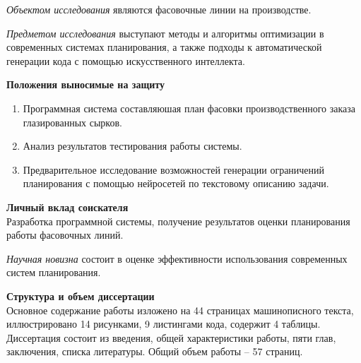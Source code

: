 \vspace{6mm}


\textit{Объектом исследования} являются фасовочные линии на производстве.

\vspace{6mm}

\textit{Предметом исследования} выступают методы и алгоритмы оптимизации в современных системах планирования, а также подходы к автоматической генерации кода с помощью искусственного интеллекта.

\vspace{6mm}

\noindent \textbf{Положения выносимые на защиту}
\begin{enumerate}
    \item Программная система составляюшая план фасовки производственного заказа глазированных сырков.
    \item Анализ результатов тестирования работы системы.
    \item Предварительное исследование возможностей генерации ограничений планирования с помощью нейросетей по текстовому описанию задачи.
\end{enumerate}

\vspace{6mm}

\noindent \textbf{Личный вклад соискателя}\\
\indent Разработка программной системы, получение результатов оценки планирования работы фасовочных линий.

\vspace{6mm}

\textit{Научная новизна} состоит в оценке эффективности использования современных систем планирования.

\vspace{6mm}

\noindent \textbf{Структура и объем диссертации}\\

Основное содержание работы изложено на 44 страницах машинописного текста, иллюстрировано 14 рисунками, 9 листингами кода, содержит 4 таблицы. Диссертация состоит из введения, общей характеристики работы, пяти глав, заключения, списка литературы. Общий объем работы – 57 страниц.
